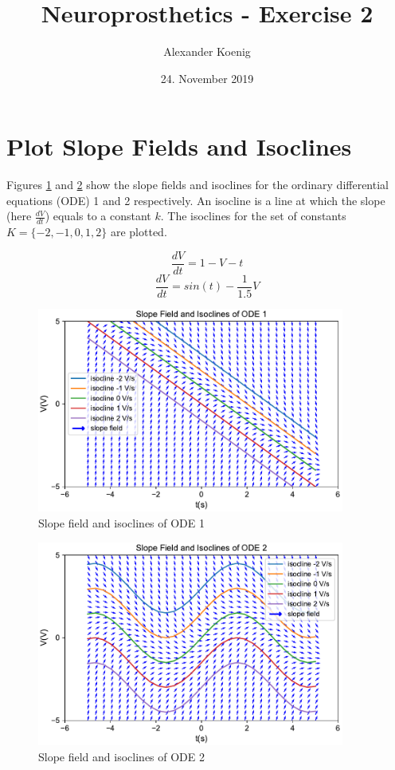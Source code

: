 \documentclass{scrartcl}
\title{Neuroprosthetics - Exercise 2}
\author{Alexander Koenig}
\date{24. November 2019}
\begin{document}
\maketitle

\section{Plot Slope Fields and Isoclines}

Figures \ref{fig:ode1} and \ref{fig:ode2} show the slope fields and isoclines for the ordinary differential equations (ODE) 1 and 2 respectively. An isocline is a line at which the slope (here $\frac{dV}{dt}$) equals to a constant $k$. The isoclines for the set of constants $K = \{-2, -1, 0, 1, 2\}$ are plotted.

\begin{equation}
	\label{eq:ode_1}
	\frac{dV}{dt} = 1 - V - t  
\end{equation}
\begin{equation}
	\label{eq:ode_2}
	\frac{dV}{dt} = sin(t) - \frac{1}{1.5}V 
\end{equation}

\begin{figure}[h]
	\centering
	\includegraphics[width=0.9\textwidth]{figures/ode_1.pdf}
	\caption{Slope field and isoclines of ODE 1}
	\label{fig:ode1}
\end{figure}

\newpage
\begin{figure}[h]
	\centering
	\includegraphics[width=0.9\textwidth]{figures/ode_2.pdf}
	\caption{Slope field and isoclines of ODE 2}
	\label{fig:ode2}
\end{figure}
\end{document}
